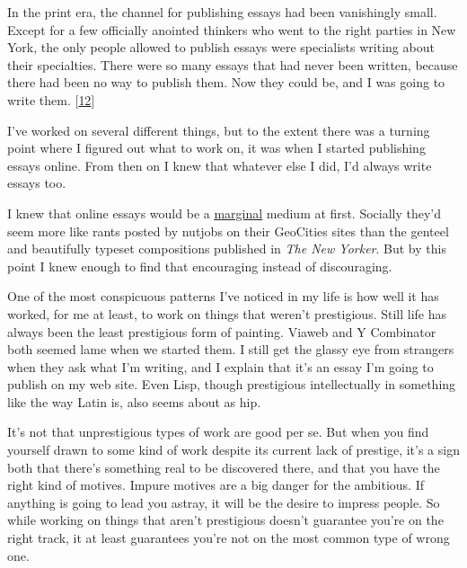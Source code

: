 In the print era, the channel for publishing
                  essays had been vanishingly small. Except for a few officially
                  anointed thinkers who went to the right parties in New York,
                  the only people allowed to publish essays were specialists
                  writing about their specialties. There were so many essays
                  that had never been written, because there had been no way to
                  publish them. Now they could be, and I was going to write
                  them.
                  [\href{\#f12n}{12}]

I've worked on several different things, but to
                  the extent there was a turning point where I figured out what
                  to work on, it was when I started publishing essays online.
                  From then on I knew that whatever else I did, I'd always write
                  essays too.

I knew that online essays would be a
                  \href{http://www.paulgraham.com/marginal.html}{\underline{marginal}} medium at first.
                  Socially they'd seem more like rants posted by nutjobs on
                  their GeoCities sites than the genteel and beautifully typeset
                  compositions published in \emph{The New Yorker}. But by this
                  point I knew enough to find that encouraging instead of
                  discouraging.

One of the most conspicuous patterns
                  I've noticed in my life is how well it has worked, for me at
                  least, to work on things that weren't prestigious. Still life
                  has always been the least prestigious form of painting. Viaweb
                  and Y Combinator both seemed lame when we started them. I
                  still get the glassy eye from strangers when they ask what I'm
                  writing, and I explain that it's an essay I'm going to publish
                  on my web site. Even Lisp, though prestigious intellectually
                  in something like the way Latin is, also seems about as
                  hip.

It's not that unprestigious types of work are
                  good per se. But when you find yourself drawn to some kind of
                  work despite its current lack of prestige, it's a sign both
                  that there's something real to be discovered there, and that
                  you have the right kind of motives. Impure motives are a big
                  danger for the ambitious. If anything is going to lead you
                  astray, it will be the desire to impress people. So while
                  working on things that aren't prestigious doesn't guarantee
                  you're on the right track, it at least guarantees you're not
                  on the most common type of wrong one.

